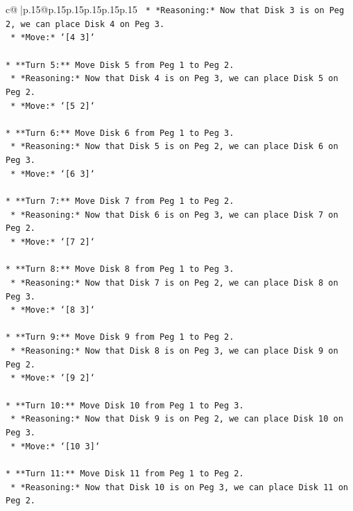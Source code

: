 \documentclass{article}
\begin{document}
{\begin{supertabular}{c@{$\;$}|p{.15\linewidth}@{}p{.15\linewidth}p{.15\linewidth}p{.15\linewidth}p{.15\linewidth}p{.15\linewidth}}
{{{\texttt{    *   *Reasoning:* Now that Disk 3 is on Peg 2, we can place Disk 4 on Peg 3.} \\
\texttt{    *   *Move:* `{[}4 3{]}`} \\
\\ 
\texttt{*   **Turn 5:** Move Disk 5 from Peg 1 to Peg 2.} \\
\texttt{    *   *Reasoning:* Now that Disk 4 is on Peg 3, we can place Disk 5 on Peg 2.} \\
\texttt{    *   *Move:* `{[}5 2{]}`} \\
\\ 
\texttt{*   **Turn 6:** Move Disk 6 from Peg 1 to Peg 3.} \\
\texttt{    *   *Reasoning:* Now that Disk 5 is on Peg 2, we can place Disk 6 on Peg 3.} \\
\texttt{    *   *Move:* `{[}6 3{]}`} \\
\\ 
\texttt{*   **Turn 7:** Move Disk 7 from Peg 1 to Peg 2.} \\
\texttt{    *   *Reasoning:* Now that Disk 6 is on Peg 3, we can place Disk 7 on Peg 2.} \\
\texttt{    *   *Move:* `{[}7 2{]}`} \\
\\ 
\texttt{*   **Turn 8:** Move Disk 8 from Peg 1 to Peg 3.} \\
\texttt{    *   *Reasoning:* Now that Disk 7 is on Peg 2, we can place Disk 8 on Peg 3.} \\
\texttt{    *   *Move:* `{[}8 3{]}`} \\
\\ 
\texttt{*   **Turn 9:** Move Disk 9 from Peg 1 to Peg 2.} \\
\texttt{    *   *Reasoning:* Now that Disk 8 is on Peg 3, we can place Disk 9 on Peg 2.} \\
\texttt{    *   *Move:* `{[}9 2{]}`} \\
\\ 
\texttt{*   **Turn 10:** Move Disk 10 from Peg 1 to Peg 3.} \\
\texttt{    *   *Reasoning:* Now that Disk 9 is on Peg 2, we can place Disk 10 on Peg 3.} \\
\texttt{    *   *Move:* `{[}10 3{]}`} \\
\\ 
\texttt{*   **Turn 11:** Move Disk 11 from Peg 1 to Peg 2.} \\
\texttt{    *   *Reasoning:* Now that Disk 10 is on Peg 3, we can place Disk 11 on Peg 2.} \\
}}}
\end{supertabular}}
\end{document}
